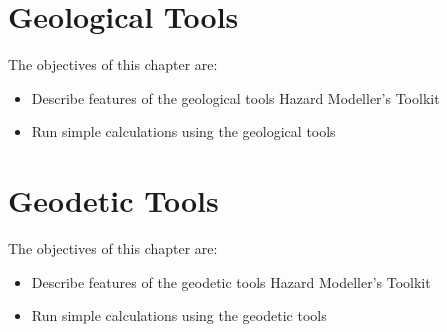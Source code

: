 \documentclass[11pt,a4paper,headings=small,dvips]{scrbook}
\newenvironment{myfancybox}{%
  \def\FrameCommand{\fboxsep=\FrameSep \fcolorbox{blue01}{honeydew}}%
  \color{black}\MakeFramed {\FrameRestore}}%
 {\endMakeFramed}
\begin{document}
\chapter{Geological Tools}
\begin{myfancybox}
The objectives of this chapter are:
\begin{itemize}
    \item Describe features of the geological tools Hazard Modeller's Toolkit 
    \item Run simple calculations using the geological tools 
\end{itemize}
\end{myfancybox}
  
\cleardoublepage


\chapter{Geodetic Tools}
\begin{myfancybox}
The objectives of this chapter are:
\begin{itemize}
    \item Describe features of the geodetic tools Hazard Modeller's Toolkit 
    \item Run simple calculations using the geodetic tools 
\end{itemize}
\end{myfancybox}
  
\cleardoublepage


%


\cleardoublepage
\printglossaries
\printindex
\end{document}
